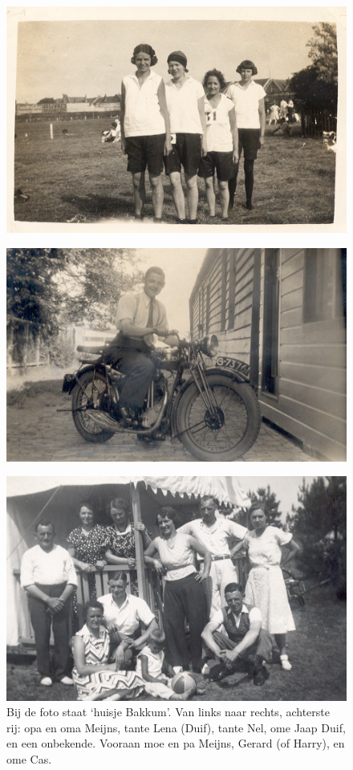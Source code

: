 \documentclass[10pt,twoside, openright]{memoir}
\begin{document}
\begin{figure}
\includegraphics[width=\textwidth]{img/30lenasport2}
\caption*{\footnotesize }
\end{figure}

\begin{figure}
\includegraphics[width=\textwidth]{img/ch4/opdebsa}
\end{figure}

\begin{figure}
\includegraphics[width=\textwidth]{img/ch2/ch2-afb12}
\caption*{\footnotesize Bij de foto staat ‘huisje Bakkum’. Van links naar rechts, achterste rij: opa en oma Meijns, tante Lena (Duif), tante Nel, ome Jaap Duif, en een onbekende. Vooraan moe en pa Meijns, Gerard (of Harry), en ome Cas.}
\end{figure}
\end{document}
